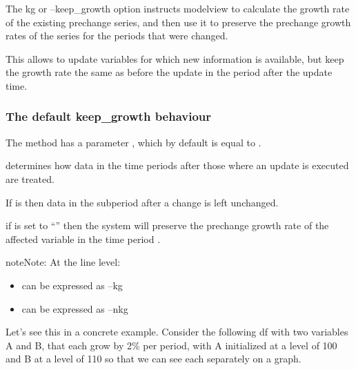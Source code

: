 \documentclass[letterpaper,10pt,english]{jupyterBook}
\begin{document}
\sphinxAtStartPar
The \sphinxhyphen{}kg or –keep\_growth option instructs modelview to calculate the growth rate of the existing pre\sphinxhyphen{}change series, and then use it to preserve the pre\sphinxhyphen{}change growth rates of the series for the periods that were  changed.

\sphinxAtStartPar
This allows to update variables for which new information is available, but keep the growth rate the same as before the update in the period after the update time.


\subsubsection{The default keep\_growth behaviour}
\label{\detokenize{content/04_PythonEssentials/UpdateCommand:the-default-keep-growth-behaviour}}
\sphinxAtStartPar
The  method has a parameter , which by default is equal to .

\sphinxAtStartPar
{} determines how data in  the time periods after those where an update is executed are treated.

\sphinxAtStartPar
If  is  then data in the sub\sphinxhyphen{}period after a change is left unchanged.

\sphinxAtStartPar
if  is set to “” then the system will preserve the pre\sphinxhyphen{}change growth rate of the affected variable in the time period .

\begin{sphinxadmonition}{note}{Note:}
\sphinxAtStartPar
At the line level:
\begin{itemize}
\item {} 
\sphinxAtStartPar
{} can be expressed as –kg

\item {} 
\sphinxAtStartPar
{} can be expressed as –nkg

\end{itemize}
\end{sphinxadmonition}

\sphinxAtStartPar
Let’s see this in a concrete example.  Consider the following  df with two variables A and B, that each grow by 2\% per period, with A initialized at a level of 100 and B at a level of 110 so that we can see each separately on a graph.
\end{document}
